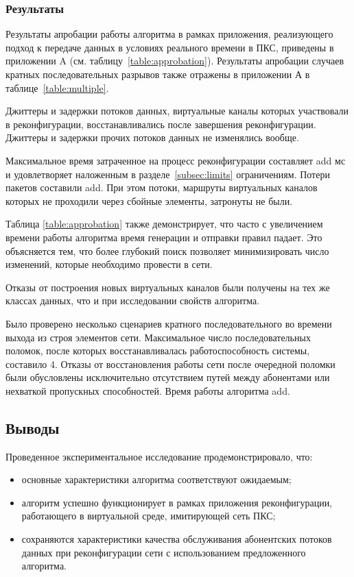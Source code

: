 \documentclass[12pt, a4paper]{article}
\begin{document}
\subsubsection{Результаты}

Результаты апробации работы алгоритма в рамках приложения, реализующего подход к передаче данных в условиях реального времени в ПКС, приведены в приложении A (см. таблицу~\ref{table:approbation}). Результаты апробации случаев кратных последовательных разрывов также отражены в приложении А в таблице~\ref{table:multiple}.

Джиттеры и задержки потоков данных, виртуальные каналы которых участвовали в реконфигурации,  восстанавливались после завершения реконфигурации. Джиттеры и задержки прочих потоков данных не изменялись вообще.

Максимальное время затраченное на процесс реконфигурации составляет add мс и удовлетворяет наложенным в разделе~\ref{subsec:limits} ограничениям. Потери пакетов составили add. При этом потоки, маршруты виртуальных каналов которых не проходили через сбойные элементы, затронуты не были.

Таблица \ref{table:approbation} также демонстрирует, что часто с увеличением времени работы алгоритма время генерации и отправки правил падает. Это объясняется тем, что более глубокий поиск позволяет минимизировать число изменений, которые необходимо провести в сети.
 
Отказы от построения новых виртуальных каналов были получены на тех же классах данных, что и при исследовании свойств алгоритма.

Было проверено несколько сценариев кратного последовательного во времени выхода из строя элементов сети. Максимальное число последовательных поломок, после которых восстанавливалась работоспособность системы, составило 4. Отказы от восстановления работы сети после очередной поломки были обусловлены исключительно отсутствием путей между абонентами или нехваткой пропускных способностей. Время работы алгоритма add.

\subsection{Выводы}
Проведенное экспериментальное исследование продемонстрировало, что:
\begin{itemize}
	\item основные характеристики алгоритма соответствуют ожидаемым;
	\item алгоритм успешно функционирует в рамках приложения реконфигурации, работающего в виртуальной среде, имитирующей сеть ПКС;
	\item сохраняются характеристики качества обслуживания абонентских потоков данных при реконфигурации сети с использованием предложенного алгоритма.
\end{itemize}
\end{document}
